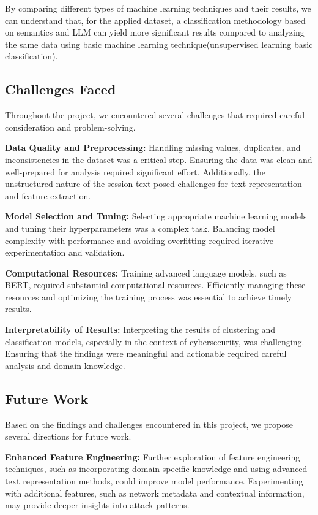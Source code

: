         By comparing different types of machine learning techniques and their results, we can understand that, for the applied dataset, a classification methodology based on semantics and LLM can yield more significant results compared to analyzing the same data using basic machine learning technique(unsupervised learning \/ basic classification).

    \subsection{Challenges Faced}
    
        Throughout the project, we encountered several challenges that required careful consideration and problem-solving.

        \textbf{Data Quality and Preprocessing:} Handling missing values, duplicates, and inconsistencies in the dataset was a critical step. Ensuring the data was clean and well-prepared for analysis required significant effort. Additionally, the unstructured nature of the session text posed challenges for text representation and feature extraction.

        \textbf{Model Selection and Tuning:} Selecting appropriate machine learning models and tuning their hyperparameters was a complex task. Balancing model complexity with performance and avoiding overfitting required iterative experimentation and validation.

        \textbf{Computational Resources:} Training advanced language models, such as BERT, required substantial computational resources. Efficiently managing these resources and optimizing the training process was essential to achieve timely results.

        \textbf{Interpretability of Results:} Interpreting the results of clustering and classification models, especially in the context of cybersecurity, was challenging. Ensuring that the findings were meaningful and actionable required careful analysis and domain knowledge.

    \subsection{Future Work}
    
        Based on the findings and challenges encountered in this project, we propose several directions for future work.

        \textbf{Enhanced Feature Engineering:} Further exploration of feature engineering techniques, such as incorporating domain-specific knowledge and using advanced text representation methods, could improve model performance. Experimenting with additional features, such as network metadata and contextual information, may provide deeper insights into attack patterns.

